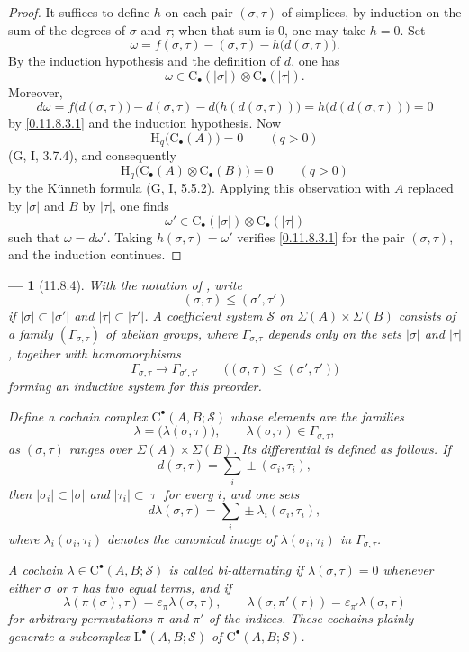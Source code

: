 \documentclass[oneside]{amsart}
\theoremstyle{ega-env-style}
\newtheorem*{env}{---}
\theoremstyle{ega-thm-env-style}
\theoremstyle{ega-defn-env-style}
\def\mathcal{\mathscr}
\def\sh{\mathcal}                   %
\def\leq{\leqslant}                 %
\def\HH{\mathrm{H}}                 %
\let\EGAOriginalLabel\label
\renewcommand{\label}[1]{\phantomsection\EGAOriginalLabel{#1}}
\begin{document}
\begin{proof}
It suffices to define $h$ on each pair $(\sigma,\tau)$ of simplices, by
induction on the sum of the degrees of $\sigma$ and $\tau$; when that sum
is $0$, one may take $h=0$.
Set
\[
  \omega
  =
  f(\sigma,\tau)-(\sigma,\tau)-h\bigl(d(\sigma,\tau)\bigr).
\]
By the induction hypothesis and the definition of $d$, one has
\[
  \omega
  \in
  \mathrm{C}_\bullet(|\sigma|)
  \otimes
  \mathrm{C}_\bullet(|\tau|).
\]
Moreover,
\[
  d\omega
  =
  f\bigl(d(\sigma,\tau)\bigr)
  -d(\sigma,\tau)
  -d\bigl(h(d(\sigma,\tau))\bigr)
  =
  h\bigl(d(d(\sigma,\tau))\bigr)
  =
  0
\]
by \eqref{0.11.8.3.1} and the induction hypothesis.
Now
\[
  \HH_q\bigl(\mathrm{C}_\bullet(A)\bigr)=0
  \qquad(q>0)
\]
(G, I, 3.7.4), and consequently
\[
  \HH_q\bigl(
    \mathrm{C}_\bullet(A)\otimes\mathrm{C}_\bullet(B)
  \bigr)=0
  \qquad(q>0)
\]
by the K\"unneth formula (G, I, 5.5.2).
Applying this observation with $A$ replaced by $|\sigma|$ and $B$ by
$|\tau|$, one finds
\[
  \omega'
  \in
  \mathrm{C}_\bullet(|\sigma|)
  \otimes
  \mathrm{C}_\bullet(|\tau|)
\]
such that $\omega=d\omega'$.
Taking $h(\sigma,\tau)=\omega'$ verifies \eqref{0.11.8.3.1} for the pair
$(\sigma,\tau)$, and the induction continues.
\end{proof}

\begin{env}[11.8.4]
\label{0.11.8.4}
With the notation of , write
\[
  (\sigma,\tau)\leq(\sigma',\tau')
\]
if $|\sigma|\subset|\sigma'|$ and $|\tau|\subset|\tau'|$.
A \emph{coefficient system} $\sh{S}$ on
$\Sigma(A)\times\Sigma(B)$ consists of a family
$(\Gamma_{\sigma,\tau})$ of abelian groups, where
$\Gamma_{\sigma,\tau}$ depends only on the sets $|\sigma|$ and
$|\tau|$, together with homomorphisms
\[
  \Gamma_{\sigma,\tau}
  \longrightarrow
  \Gamma_{\sigma',\tau'}
  \qquad
  \bigl((\sigma,\tau)\leq(\sigma',\tau')\bigr)
\]
forming an inductive system for this preorder.

Define a cochain complex $\mathrm{C}^\bullet(A,B;\sh{S})$ whose elements
are the families
\[
  \lambda=\bigl(\lambda(\sigma,\tau)\bigr),
  \qquad
  \lambda(\sigma,\tau)\in\Gamma_{\sigma,\tau},
\]
as $(\sigma,\tau)$ ranges over $\Sigma(A)\times\Sigma(B)$.
Its differential is defined as follows.
If
\[
  d(\sigma,\tau)=\sum_i\pm(\sigma_i,\tau_i),
\]
then $|\sigma_i|\subset|\sigma|$ and $|\tau_i|\subset|\tau|$ for every
$i$, and one sets
\[
  d\lambda(\sigma,\tau)
  =
  \sum_i\pm\lambda_i(\sigma_i,\tau_i),
\]
where $\lambda_i(\sigma_i,\tau_i)$ denotes the canonical image of
$\lambda(\sigma_i,\tau_i)$ in $\Gamma_{\sigma,\tau}$.

A cochain $\lambda\in\mathrm{C}^\bullet(A,B;\sh{S})$ is called
\emph{bi-alternating} if $\lambda(\sigma,\tau)=0$ whenever either
$\sigma$ or $\tau$ has two equal terms, and if
\[
  \lambda(\pi(\sigma),\tau)
  =
  \varepsilon_\pi\lambda(\sigma,\tau),
  \qquad
  \lambda(\sigma,\pi'(\tau))
  =
  \varepsilon_{\pi'}\lambda(\sigma,\tau)
\]
for arbitrary permutations $\pi$ and $\pi'$ of the indices.
These cochains plainly generate a subcomplex
$\mathrm{L}^\bullet(A,B;\sh{S})$ of
$\mathrm{C}^\bullet(A,B;\sh{S})$.
\end{env}
\end{document}

